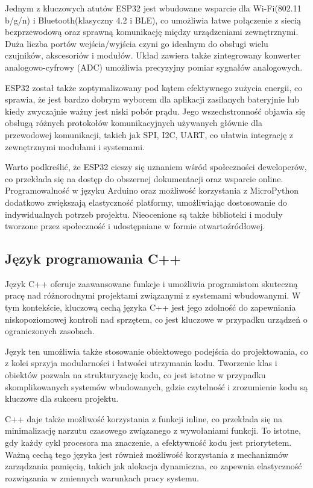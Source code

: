 \documentclass[12pt,twoside,draft]{article}
\begin{document}
Jednym z kluczowych atutów ESP32 jest wbudowane wsparcie dla Wi-Fi(802.11 b/g/n) i Bluetooth(klasyczny 4.2 i BLE),
 co umożliwia łatwe połączenie z siecią bezprzewodową oraz sprawną komunikację między urządzeniami zewnętrznymi.
 Duża licz\-ba portów wejścia/wyjścia czyni go idealnym do obsługi wielu czujników, akscesoriów i modułów. Układ zawiera także 
zintegrowany konwerter analogowo-cyfrowy (ADC) umożliwia precyzyjny pomiar sygnałów analogowych.

ESP32 został także zoptymalizowany pod kątem efektywnego zużycia energii, co sprawia, że jest bardzo dobrym
 wyborem dla aplikacji zasilanych bateryjnie lub kiedy zwyczajnie ważny jest niski pobór prądu. Jego wszechstronność objawia
się obsługą różnych protokołów komunikacyjnych używanych głównie dla przewodowej komunikacji, 
takich jak SPI, I2C, UART, co ułatwia integrację z zewnętrznymi modułami i systemami.

Warto podkreślić, że ESP32 cieszy się uznaniem wśród społeczności deweloperów, co przekłada się na dostęp
 do obszernej dokumentacji oraz wsparcie online. Programowalność w języku Arduino oraz możliwość korzystania 
 z MicroPython dodatkowo zwiększają elastyczność platformy, umożliwiając dostosowanie do indywidualnych potrzeb projektu.
 Nieocenione są także biblioteki i moduły tworzone przez społeczność i udostępniane w formie otwartoźródłowej.
\subsection{Język programowania C++}
Język C++ \cite{swider2004} oferuje zaawansowane funkcje i umożliwia programistom skuteczną pracę nad różnorodnymi projektami związanymi z systemami wbudowanymi.
W tym kontekście, kluczową cechą języka C++ jest jego zdolność do zapewniania niskopoziomowej kontroli nad sprzętem,
co jest kluczowe w przypadku urządzeń o ograniczonych zasobach. 

Język ten umożliwia także stosowanie obiektowego podejścia do projektowania, co z kolei sprzyja modularności i łatwości utrzymania kodu.
Tworzenie klas i obiektów pozwala na strukturyzację kodu, co jest istotne w przypadku skomplikowanych systemów wbudowanych, gdzie 
czytelność i zrozumienie kodu są kluczowe dla sukcesu projektu.

C++ daje także możliwość korzystania z funkcji inline, co przekłada się na minimalizację narzutu czasowego związanego z wywołaniami funkcji.
To istotne, gdy każdy cykl procesora ma znaczenie, a efektywność kodu jest priorytetem. Ważną cechą tego języka  
 jest również możliwość korzystania z mechanizmów zarządzania pamięcią, takich jak alokacja dynamiczna, co zapewnia elastyczność rozwiązania
 w zmiennych warunkach pracy systemu.
\end{document}
